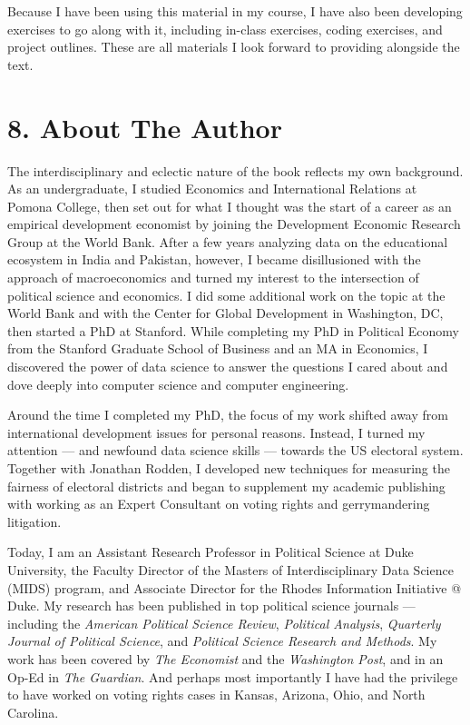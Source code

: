\documentclass[12pt]{article}
\begin{document}
Because I have been using this material in my course, I have also been
developing exercises to go along with it, including in-class exercises,
coding exercises, and project outlines. These are all materials I look
forward to providing alongside the text.

\section*{8. About The Author}\label{about-the-author}

The interdisciplinary and eclectic nature of the book reflects my own
background. As an undergraduate, I studied Economics and International
Relations at Pomona College, then set out for what I thought was the
start of a career as an empirical development economist by joining the
Development Economic Research Group at the World Bank. After a few years
analyzing data on the educational ecosystem in India and Pakistan,
however, I became disillusioned with the approach of macroeconomics and
turned my interest to the intersection of political science and
economics. I did some additional work on the topic at the World Bank and
with the Center for Global Development in Washington, DC, then started a
PhD at Stanford. While completing my PhD in Political Economy from the
Stanford Graduate School of Business and an MA in Economics, I
discovered the power of data science to answer the questions I cared
about and dove deeply into computer science and computer engineering.

Around the time I completed my PhD, the focus of my work shifted away
from international development issues for personal reasons. Instead, I
turned my attention --- and newfound data science skills --- towards the
US electoral system. Together with Jonathan Rodden, I developed new
techniques for measuring the fairness of electoral districts and began
to supplement my academic publishing with working as an Expert
Consultant on voting rights and gerrymandering litigation.

Today, I am an Assistant Research Professor in Political Science at Duke
University, the Faculty Director of the Masters of Interdisciplinary
Data Science (MIDS) program, and Associate Director for the Rhodes
Information Initiative @ Duke. My research has been published in top
political science journals --- including the \emph{American Political
Science Review}, \emph{Political Analysis}, \emph{Quarterly Journal of
Political Science}, and \emph{Political Science Research and Methods}.
My work has been covered by \emph{The Economist} and the
\emph{Washington Post}, and in an Op-Ed in \emph{The Guardian}. And
perhaps most importantly I have had the privilege to have worked on
voting rights cases in Kansas, Arizona, Ohio, and North Carolina.

\end{document}
